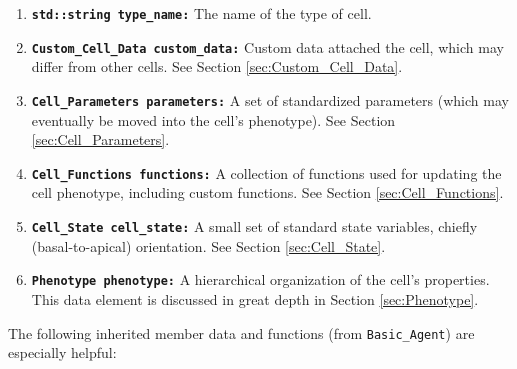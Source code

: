 \documentclass[12pt]{article}
\renewcommand{\v}{\verb}
\newcommand{\smallcode}[1]{\textbf{\texttt{#1}}}
\begin{document}
\begin{enumerate}
\item 
\smallcode{std::string type\_name:} The name of the type of cell. 
\item 
\smallcode{Custom\_Cell\_Data custom\_data:} Custom data attached the cell, which may 
differ from other cells. See Section \ref{sec:Custom_Cell_Data}. 

\item 
\smallcode{Cell\_Parameters parameters:} A set of standardized parameters 
(which may eventually be moved into the cell's phenotype). See 
Section \ref{sec:Cell_Parameters}. 

\item 
\smallcode{Cell\_Functions functions:} A collection of functions used for 
updating the cell phenotype, including custom functions. 
See Section \ref{sec:Cell_Functions}. 

\item 
\smallcode{Cell\_State cell\_state:} A small set of standard state variables,
chiefly (basal-to-apical) orientation. See Section 
\ref{sec:Cell_State}. 

\item 
\smallcode{Phenotype phenotype:} A hierarchical organization of the cell's 
properties. This data element is discussed in great depth 
in Section \ref{sec:Phenotype}.  
\end{enumerate} 

The following inherited member data and functions (from \v|Basic_Agent|) 
are especially helpful: 
\end{document}
